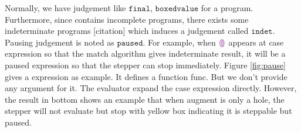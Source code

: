 Normally, we have judgement like $\mathtt{final}$, $\mathtt{boxedvalue}$ for a program. Furthermore, since \Hazel contains incomplete programs, there exists some indeterminate programs [citation] which induces a judgement called $\mathtt{indet}$. Pausing judgement is noted as $\mathtt{paused}$. For example, when $\textcolor{violet}{\llparenthesis}\textcolor{violet}{\rrparenthesis}$ appears at case expression so that the match algorithm gives indeterminate result, it will be a paused expression so that the stepper can stop immediately. Figure \ref{fig:pause} gives a expression as example. It defines a function func. But we don't provide any argument for it. The evaluator expand the case expression directly. However, the result in bottom shows an example that when augment is only a hole, the stepper will not evaluate but stop with yellow box indicating it is steppable but paused.

